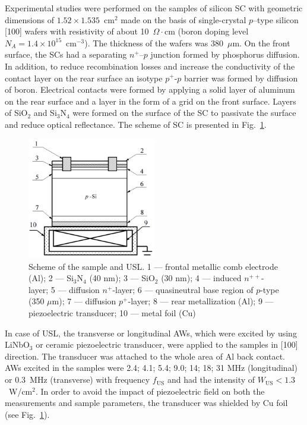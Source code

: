 \documentclass[sn-mathphys]{sn-jnl}%
\theoremstyle{thmstyleone}%
\theoremstyle{thmstyletwo}%
\theoremstyle{thmstylethree}%
\begin{document}
Experimental studies were performed on the samples of silicon SC with geometric dimensions of $1.52\times1.535$~cm$^2$ made on the basis of single-crystal  $p$--type silicon [100] wafers with resistivity of about 10~$\Omega\cdot$cm
(boron doping level  $N_A=1.4\times10^{15}$~cm$^{-3}$).
The thickness of the wafers was 380~$\mu$m.
On the front surface, the SCs had a separating $n^+$--$p$ junction formed by phosphorus diffusion.
In addition, to reduce recombination losses and increase the conductivity of the contact layer
on the rear surface an isotype $p^+$-$p$ barrier was formed by diffusion of boron.
Electrical contacts were formed by applying a solid layer of aluminum on the rear surface and a layer in the form of a grid on the front surface.
Layers of SiO$_2$ and Si$_3$N$_4$ were formed on the surface of the SC to passivate the surface and reduce optical reflectance.
The scheme of SC is presented in Fig.~\ref{figChem}.
\begin{figure}
\centering
\includegraphics[width=0.5\textwidth]{Fig1}
\caption{Scheme of the sample and USL.
1 –-- frontal metallic comb electrode (Al);
2 --– Si$_3$N$_4$ (40 nm);
3 –-- SiO$_2$ (30 nm);
4 –-- induced $n^{++}$-layer;
5 –-- diffusion $n^+$-layer;
6 –-- quasineutral base region of $p$-type (350 $\mu$m);
7 –-- diffusion $p^+$-layer;
8 –-- rear metallization (Al);
9 –-- piezoelectric transducer;
10 –-- metal foil (Cu)}
\label{figChem}       %
\end{figure}

In case of USL, the transverse or longitudinal AWs, which were excited by using LiNbO$_3$ or ceramic piezoelectric transducer,
were applied to the samples in [100] direction.
The transducer was attached to the whole area of Al back contact.
AWs excited in the samples were 2.4; 4.1; 5.4; 9.0; 14; 18; 31 MHz (longitudinal) or 0.3~MHz (transverse)
with frequency $f_\mathrm{US}$ and had the intensity of $W_\mathrm{US}<1.3$~W/cm$^2$.
In order to avoid the impact of piezoelectric field on both the measurements and sample parameters,
the transducer was shielded by Cu foil (see Fig.~\ref{figChem}).
\end{document}
